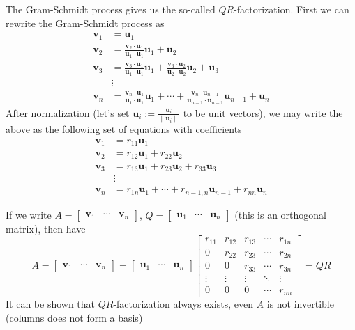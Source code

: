 \documentclass{beamer}
\theoremstyle{definition}
\theoremstyle{remark}
\begin{document}
\begin{frame}[t]
The Gram-Schmidt process gives us the so-called $QR$-factorization. First we can rewrite the Gram-Schmidt process as
\begin{align*}
\mathbf v_1&=\mathbf u_1\\
\mathbf v_2&=\textstyle\frac{\mathbf v_2\cdot\mathbf u_1}{\mathbf u_1\cdot\mathbf u_1}\mathbf u_1+\mathbf u_2\\
\mathbf v_3&=\textstyle\frac{\mathbf v_3\cdot\mathbf u_1}{\mathbf u_1\cdot\mathbf u_1}\mathbf u_1+\frac{\mathbf v_3\cdot\mathbf u_2}{\mathbf u_2\cdot\mathbf u_2}\mathbf u_2+\mathbf u_3\\
&\vdots\\
\mathbf v_n&=\textstyle\frac{\mathbf v_n\cdot\mathbf u_1}{\mathbf u_1\cdot\mathbf u_1}\mathbf u_1+\cdots+\frac{\mathbf v_n\cdot\mathbf u_{n-1}}{\mathbf u_{n-1}\cdot\mathbf u_{n-1}}\mathbf u_{n-1}+\mathbf u_n
\end{align*}
\pause
After normalization (let's set $\mathbf u_i:=\frac{\mathbf u_i}{\|\mathbf u_i\|}$ to be unit vectors), we may write the above as the following set of equations with coefficients
\begin{align*}
\mathbf v_1&=r_{11}\mathbf u_1\\
\mathbf v_2&=r_{12}\mathbf u_1+r_{22}\mathbf u_2\\
\mathbf v_3&=r_{13}\mathbf u_1+r_{23}\mathbf u_2+r_{33}\mathbf u_3\\
&\vdots\\
\mathbf v_n&=r_{1n}\mathbf u_1+\cdots+r_{n-1,n}\mathbf u_{n-1}+r_{nn}\mathbf u_n
\end{align*}
\end{frame}

\begin{frame}[t]
If we write $A=\begin{bmatrix}
\mathbf v_1&\cdots&\mathbf v_n
\end{bmatrix}$, $Q=\begin{bmatrix}
\mathbf u_1&\cdots&\mathbf u_n
\end{bmatrix}$ (this is an orthogonal matrix), then have
\[
A=\begin{bmatrix}
\mathbf v_1&\cdots&\mathbf v_n
\end{bmatrix}=\begin{bmatrix}
\mathbf u_1&\cdots&\mathbf u_n
\end{bmatrix}\begin{bmatrix}
r_{11}&r_{12}&r_{13}&\cdots& r_{1n}\\
0&r_{22}&r_{23}&\cdots&r_{2n}\\
0&0&r_{33}&\cdots&r_{3n}\\
\vdots&\vdots&\vdots&\ddots&\vdots\\
0&0&0&\cdots&r_{nn}
\end{bmatrix}=QR
\]\pause
It can be shown that $QR$-factorization always exists, even $A$ is not invertible (columns does not form a basis)
\end{frame}
\end{document}
